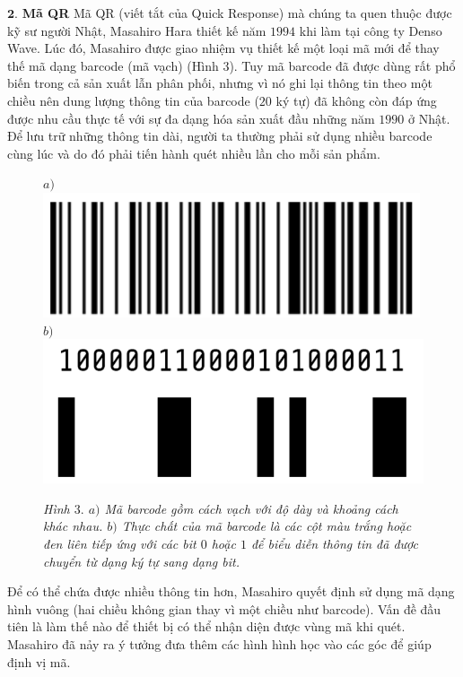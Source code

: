 \begin{multicols}{2}
	\vskip 0.1cm
	$\pmb{2.}$ \textbf{\color{toanhocdoisong}Mã QR}
	\vskip 0.1cm
	Mã QR (viết tắt của Quick Response) mà chúng ta quen thuộc được kỹ sư người Nhật, Masahiro Hara thiết kế năm $1994$ khi làm tại công ty Denso Wave. Lúc đó, Masahiro được giao nhiệm vụ thiết kế một loại mã mới để thay thế mã dạng barcode (mã vạch) (Hình $3$). Tuy mã barcode đã được dùng rất phổ biến trong cả sản xuất lẫn phân phối, nhưng vì nó ghi lại thông tin theo một chiều nên dung lượng thông tin của barcode ($20$ ký tự) đã không còn đáp ứng được nhu cầu thực tế với sự đa dạng hóa sản xuất đầu những năm $1990$ ở Nhật. Để lưu trữ những thông tin dài, người ta thường phải sử dụng nhiều barcode cùng lúc và do đó phải tiến hành quét nhiều lần cho mỗi sản phẩm.
	\begin{figure}[H]
		\vspace*{-5pt}
		\centering
		\captionsetup{labelformat= empty, justification=centering}
		$a)$\includegraphics[width= 0.9\linewidth]{4}
		$b)$\includegraphics[width= 0.9\linewidth]{5}
		\caption{\small\textit{\color{toanhocdoisong}Hình $3.$ $a)$ Mã barcode gồm cách vạch với độ dày và khoảng cách khác nhau. $b)$ Thực chất của mã barcode là các cột màu trắng hoặc đen liên tiếp ứng với các bit $0$ hoặc $1$ để biểu diễn thông tin đã được chuyển từ dạng ký tự sang dạng bit.}}
		\vspace*{-10pt}
	\end{figure}
	Để có thể chứa được nhiều thông tin hơn, Masahiro quyết định sử dụng mã dạng hình vuông (hai chiều không gian thay vì một chiều như barcode). Vấn đề đầu tiên là làm thế nào để thiết bị có thể nhận diện được vùng mã khi quét. Masahiro đã nảy ra ý tưởng đưa thêm các hình hình học vào các góc để giúp định vị mã.

\end{multicols}
